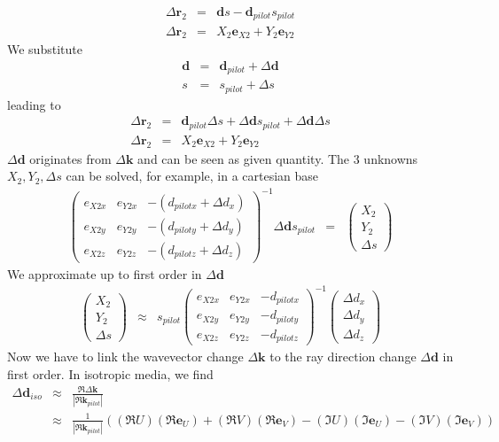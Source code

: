 \documentclass[12pt,a4paper,twoside,openright,BCOR10mm,headsepline,titlepage,abstracton,chapterprefix,final]{scrreprt}
\newcommand\Vector[1]{{\mathbf{#1}}}
\newcommand\wavenumber{k}
\newcommand\Wavevector{\Vector{\wavenumber}}
\begin{document}
\begin{eqnarray}
  \Delta \Vector{r}_2  &=& \Vector{d} s - \Vector{d}_{pilot} s_{pilot} \\
  \Delta \Vector{r}_2  &=& X_2 \Vector{e}_{X2} + Y_2 \Vector{e}_{Y2}
\end{eqnarray}
We substitute
\begin{eqnarray}
 \Vector{d} &=& \Vector{d}_{pilot} + \Delta \Vector{d} \\
 s &=& s_{pilot} + \Delta s
\end{eqnarray}
leading to
\begin{eqnarray}
  \Delta \Vector{r}_2  &=& \Vector{d}_{pilot} \Delta s + \Delta \Vector{d} s_{pilot} + \Delta \Vector{d} \Delta s \\
  \Delta \Vector{r}_2  &=& X_2 \Vector{e}_{X2} + Y_2 \Vector{e}_{Y2}
\end{eqnarray}
$\Delta \Vector{d}$ originates from $\Delta \Wavevector$ and can be seen as given quantity.
The 3 unknowns $X_2 , Y_2 , \Delta s$ can be solved, for example, in a cartesian base
\begin{eqnarray}
 \begin{pmatrix}
  e_{X2x} & e_{Y2x} & - ( d_{pilotx} + \Delta d_x ) \\
  e_{X2y} & e_{Y2y} & - ( d_{piloty} + \Delta d_y ) \\
  e_{X2z} & e_{Y2z} & - ( d_{pilotz} + \Delta d_z ) 
 \end{pmatrix}^{-1}
 \Delta \Vector{d} s_{pilot} &=& 
 \begin{pmatrix}
  X_2 \\ Y_2 \\ \Delta s
 \end{pmatrix} 
\end{eqnarray}
We approximate up to first order in $\Delta \Vector{d}$
\begin{eqnarray}
 \begin{pmatrix}
  X_2 \\ Y_2 \\ \Delta s
 \end{pmatrix} 
 &\approx& s_{pilot}
 \begin{pmatrix}
  e_{X2x} & e_{Y2x} & - d_{pilotx} \\
  e_{X2y} & e_{Y2y} & - d_{piloty} \\
  e_{X2z} & e_{Y2z} & - d_{pilotz} 
 \end{pmatrix}^{-1}
 \begin{pmatrix}
  \Delta d_x \\ \Delta d_y \\ \Delta d_z
 \end{pmatrix}
\end{eqnarray}
Now we have to link the wavevector change $\Delta \Wavevector$ to the ray direction change $\Delta \Vector{d}$ in first order.
In isotropic media, we find
\begin{eqnarray}
 \Delta \Vector{d}_{iso} 
 &\approx& \frac{\Re \Delta \Wavevector}{|\Re \Wavevector_{pilot}|}
 \\
 &\approx&
  \frac{1}{|\Re \Wavevector_{pilot}|}
  \left(
      (\Re U)(\Re \Vector{e}_U)
    + (\Re V)(\Re \Vector{e}_V)
    - (\Im U)(\Im \Vector{e}_U)
    - (\Im V)(\Im \Vector{e}_V)
  \right) \nonumber
\end{eqnarray}
\end{document}
